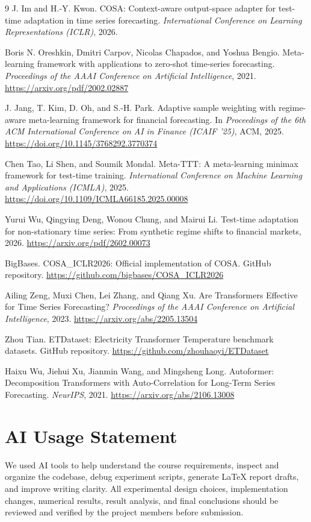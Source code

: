 \documentclass[10pt]{article}
\begin{document}
\clearpage
\begin{thebibliography}{9}
J. Im and H.-Y. Kwon. COSA: Context-aware output-space adapter for test-time adaptation in time series forecasting. \textit{International Conference on Learning Representations (ICLR)}, 2026.

Boris N. Oreshkin, Dmitri Carpov, Nicolas Chapados, and Yoshua Bengio. Meta-learning framework with applications to zero-shot time-series forecasting. \textit{Proceedings of the AAAI Conference on Artificial Intelligence}, 2021. \url{https://arxiv.org/pdf/2002.02887}

J. Jang, T. Kim, D. Oh, and S.-H. Park. Adaptive sample weighting with regime-aware meta-learning framework for financial forecasting. In \textit{Proceedings of the 6th ACM International Conference on AI in Finance (ICAIF '25)}, ACM, 2025. \url{https://doi.org/10.1145/3768292.3770374}

Chen Tao, Li Shen, and Soumik Mondal. Meta-TTT: A meta-learning minimax framework for test-time training. \textit{International Conference on Machine Learning and Applications (ICMLA)}, 2025. \url{https://doi.org/10.1109/ICMLA66185.2025.00008}

Yurui Wu, Qingying Deng, Wonou Chung, and Mairui Li. Test-time adaptation for non-stationary time series: From synthetic regime shifts to financial markets, 2026. \url{https://arxiv.org/pdf/2602.00073}

BigBases. COSA\_ICLR2026: Official implementation of COSA. GitHub repository. \url{https://github.com/bigbases/COSA_ICLR2026}

Ailing Zeng, Muxi Chen, Lei Zhang, and Qiang Xu. Are Transformers Effective for Time Series Forecasting? \textit{Proceedings of the AAAI Conference on Artificial Intelligence}, 2023. \url{https://arxiv.org/abs/2205.13504}

Zhou Tian. ETDataset: Electricity Transformer Temperature benchmark datasets. GitHub repository. \url{https://github.com/zhouhaoyi/ETDataset}

Haixu Wu, Jiehui Xu, Jianmin Wang, and Mingsheng Long. Autoformer: Decomposition Transformers with Auto-Correlation for Long-Term Series Forecasting. \textit{NeurIPS}, 2021. \url{https://arxiv.org/abs/2106.13008}
\end{thebibliography}

\section*{AI Usage Statement}
We used AI tools to help understand the course requirements, inspect and organize the codebase, debug experiment scripts, generate LaTeX report drafts, and improve writing clarity. All experimental design choices, implementation changes, numerical results, result analysis, and final conclusions should be reviewed and verified by the project members before submission.
\end{document}
